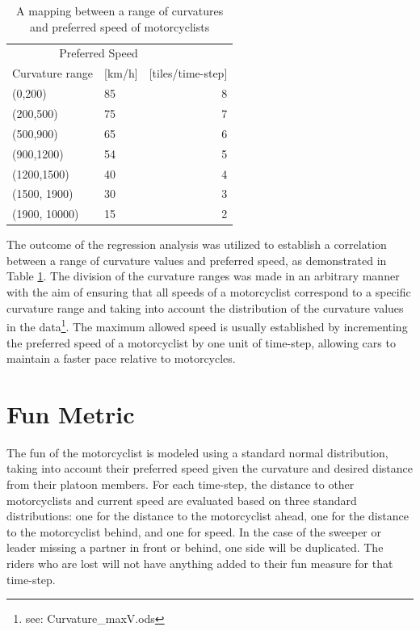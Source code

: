     \begin{table}[htb]
    \centering
    \begin{tabular}{@{}llr@{}} \toprule
    \multicolumn{2}{r}{Preferred Speed}             \\ \cmidrule(l){2-3}
        Curvature range & [km/h] & [tiles/time-step]        \\ \midrule
        (0,200)         & 85        & 8 \\
        (200,500)       & 75        & 7 \\
        (500,900)       & 65        & 6 \\
        (900,1200)      & 54        & 5 \\
        (1200,1500)     & 40        & 4 \\
        (1500, 1900)    & 30        & 3 \\
        (1900, 10000)   & 15        & 2 \\ \bottomrule
    \end{tabular}
    \caption{A mapping between a range of curvatures and preferred speed of motorcyclists} 
    \label{tab:dictPrefspeed}
    \end{table}
The outcome of the regression analysis was utilized to establish a correlation between a range of curvature values and preferred speed, as demonstrated in Table \ref{tab:dictPrefspeed}. The division of the curvature ranges was made in an arbitrary manner with the aim of ensuring that all speeds of a motorcyclist correspond to a specific curvature range and taking into account the distribution of the curvature values in the data\footnote{see: Curvature\_maxV.ods}. The maximum allowed speed is usually established by incrementing the preferred speed of a motorcyclist by one unit of time-step, allowing cars to maintain a faster pace relative to motorcycles.

\section{Fun Metric}
\label{sec:Fun Metric}
The fun of the motorcyclist is modeled using a standard normal distribution, taking into account their preferred speed given the curvature and desired distance from their platoon members. For each time-step, the distance to other motorcyclists and current speed are evaluated based on three standard distributions: one for the distance to the motorcyclist ahead, one for the distance to the motorcyclist behind, and one for speed. In the case of the sweeper or leader missing a partner in front or behind, one side will be duplicated. The riders who are lost will not have anything added to their fun measure for that time-step. \\

